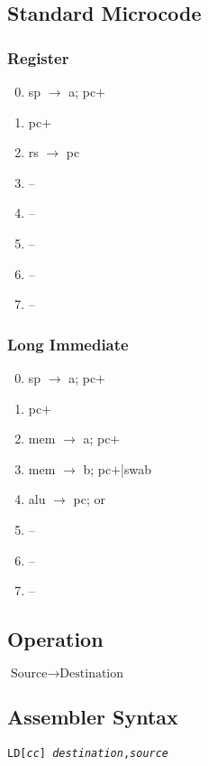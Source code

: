 \documentclass[11pt]{book}
\newcommand*{\instruction}[2][]{%
  \clearpage
  \thispagestyle{fancy}%
  \fancyhf[HL,HR]{\huge{#2}}%
  \fancyhf[HC]{#1}\addtocounter{section}{1}\noindent
}
\begin{document}
\subsection*{Standard Microcode}
\begin{multicols}{2}\ttfamily\selectfont\small
  \subsubsection*{Register}
  \begin{enumerate}\setcounter{enumi}{-1}
  \item sp \(\rightarrow\) a; pc\(+\)
  \item pc\(+\)
  \item rs \(\rightarrow\) pc
  \item --
  \item --
  \item --
  \item --
  \item --
  \end{enumerate}
  \columnbreak
  \subsubsection*{Long Immediate}
  \begin{enumerate}\setcounter{enumi}{-1}
  \item sp \(\rightarrow\) a; pc\(+\)
  \item pc\(+\)
  \item mem \(\rightarrow\) a; pc\(+\)
  \item mem \(\rightarrow\) b; pc\(+\)|swab
  \item alu \(\rightarrow\) pc; or
  \item --
  \item --
  \item --
  \end{enumerate}
\end{multicols}


\instruction[Load]{LD}
\subsection*{Operation}
\(\text{Source}\rightarrow\text{Destination}\)

\subsection*{Assembler Syntax}
\texttt{LD[\textit{cc}] \textit{destination},\textit{source}}
\end{document}
